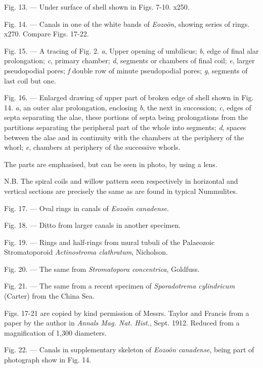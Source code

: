 \documentclass[a4paper, 12pt, oneside]{article}
\begin{document}
Fig. 13. --- Under surface of shell shown in Figs. 7-10. x250.

Fig. 14. --- Canals in one of the white bands of \emph{Eozoön}, showing series of rings. x270. Compare Figs. 17-22.

Fig. 15. --- A tracing of Fig. 2. \emph{a}, Upper opening of umbilicus; \emph{b}, edge of final alar prolongation; \emph{c}, primary chamber; \emph{d}, segments or chambers of final coil; \emph{e}, larger pseudopodial pores; \emph{f} double row of minute pseudopodial pores; \emph{g}, segments of last coil but one.

Fig. 16. --- Enlarged drawing of upper part of broken edge of shell shown in Fig. 14. \emph{a}, an outer alar prolongation, enclosing \emph{b}, the next in succession; \emph{c}, edges of septa separating the alae, these portions of septa being prolongations from the partitions separating the peripheral part of the whole into segments; \emph{d}, spaces between the alae and in continuity with the chambers at the periphery of the whorl; \emph{e}, chambers at periphery of the successive whorls.

The parts are emphasised, but can be seen in photo, by using a lens.

N.B. The spiral coils and willow pattern seen respectively in horizontal and vertical sections are precisely the same as are found in typical Nummulites.

Fig. 17. --- Oval rings in canals of \emph{Eozoön canadense}.

Fig. 18. --- Ditto from larger canals in another specimen.

Fig. 19. --- Rings and half-rings from mural tubuli of the Palaeozoic Stromatoporoid \emph{Actinostroma clathratum}, Nicholson.

Fig. 20. --- The same from \emph{Stromatopora concentrica}, Goldfuss.

Fig. 21. --- The same from a recent specimen of \emph{Sporadotrema cylindricum} (Carter) from the China Sea. 

Figs. 17-21 are copied by kind permission of Messrs. Taylor and Francis from a paper by the author in \emph{Annals Mag. Nat. Hist.}, Sept. 1912. Reduced from a magnification of 1,300 diameters.

Fig. 22. --- Canals in supplementary skeleton of \emph{Eozoön canadense}, being part of photograph show in Fig. 14.
\end{document}
